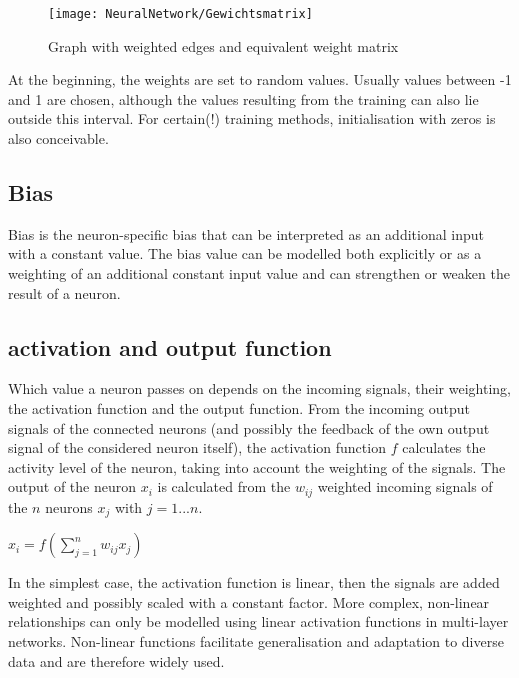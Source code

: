 \begin{figure}[H]
	\begin{center}
		\texttt{[image: NeuralNetwork/Gewichtsmatrix]}
		\caption{Graph with weighted edges and equivalent weight matrix} 
		\label{Gewichtsmatrix}
	\end{center}
\end{figure}

At the beginning, the weights are set to random values. Usually values between -1 and 1 are chosen, although the values resulting from the training can also lie outside this interval. \cite{Moeser:2018} For certain(!) training methods, initialisation with zeros is also conceivable. \cite{Kononenko:2007}

\subsection{Bias}

Bias is the neuron-specific bias that can be interpreted as an additional input with a constant value. The bias value can be modelled both explicitly or as a weighting of an additional constant input value and can strengthen or weaken the result of a neuron. \cite{Ziegler:2015}

\subsection{activation and output function} \label{activation and output function} 

Which value a neuron passes on depends on the incoming signals, their weighting, the activation function and the output function. From the incoming output signals of the connected neurons (and possibly the feedback of the own output signal of the considered neuron itself), the activation function $f$ calculates the activity level of the neuron, taking into account the weighting of the signals. \cite{Kruse:2015} The output of the neuron $x_i$ is calculated from the $w_{ij}$ weighted incoming signals of the $n$ neurons $x_j$ with $j = 1...n$.

\begin{center}
$x_i = f(\sum \limits_{j=1}^n w_{ij} x_j)$
\end{center}

In the simplest case, the activation function is linear, then the signals are added weighted and possibly scaled with a constant factor. More complex, non-linear relationships can only be modelled using linear activation functions in multi-layer networks.\cite{Kononenko:2007} Non-linear functions facilitate generalisation and adaptation to diverse data and are therefore widely used. \cite{Gupta:2020b}

